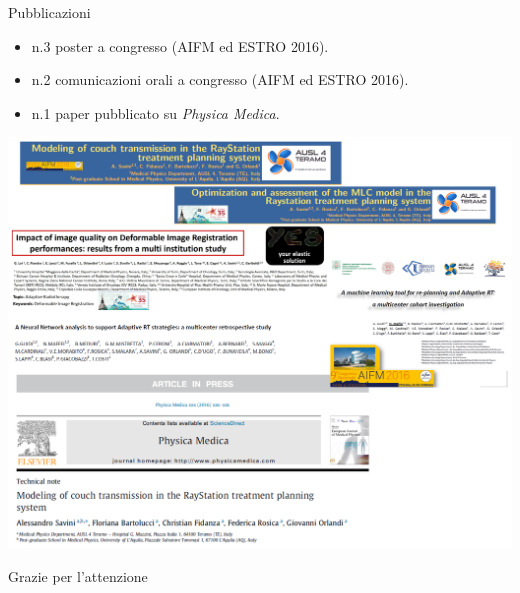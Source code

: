 \documentclass{beamer}
\begin{document}
\begin{frame}{Pubblicazioni}
\begin{itemize}
\tiny
\item n.3 poster a congresso (AIFM ed ESTRO 2016).
\item n.2 comunicazioni orali a congresso (AIFM ed ESTRO 2016).
\item n.1 paper pubblicato su \textit{Physica Medica}.
\end{itemize}
\begin{center}
\includegraphics[width=.9\textwidth]{./img/Pub.png}
\end{center}
\end{frame}

\begin{frame}
\centering
\Huge Grazie per l'attenzione
\end{frame}
\end{document}
